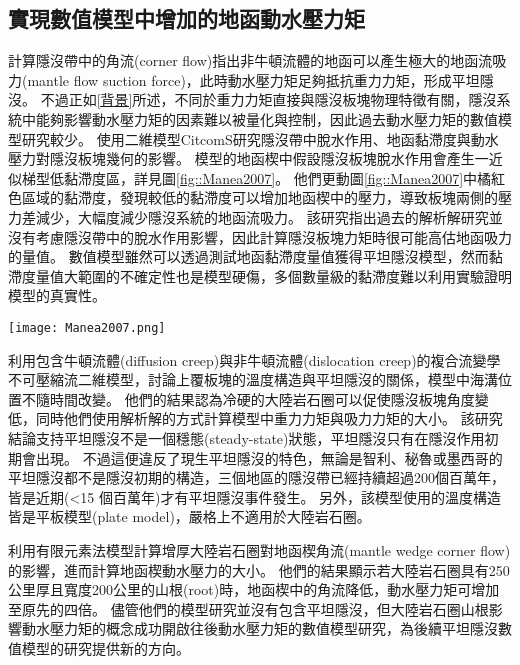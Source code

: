 \subsection{實現數值模型中增加的地函動水壓力矩}
\citealp{tovish1978mantle}計算隱沒帶中的角流(corner flow)指出非牛頓流體的地函可以產生極大的地函流吸力(mantle flow suction force)，此時動水壓力矩足夠抵抗重力力矩，形成平坦隱沒。
不過正如\ref{背景}所述，不同於重力力矩直接與隱沒板塊物理特徵有關，隱沒系統中能夠影響動水壓力矩的因素難以被量化與控制，因此過去動水壓力矩的數值模型研究較少。
\citealp{Manea2007}使用二維模型CitcomS研究隱沒帶中脫水作用、地函黏滯度與動水壓力對隱沒板塊幾何的影響。
模型的地函楔中假設隱沒板塊脫水作用會產生一近似梯型低黏滯度區，詳見圖\ref{fig::Manea2007}。
他們更動圖\ref{fig::Manea2007}中橘紅色區域的黏滯度，發現較低的黏滯度可以增加地函楔中的壓力，導致板塊兩側的壓力差減少，大幅度減少隱沒系統的地函流吸力。
該研究指出過去\citealp{tovish1978mantle}的解析解研究並沒有考慮隱沒帶中的脫水作用影響，因此計算隱沒板塊力矩時很可能高估地函吸力的量值。
數值模型雖然可以透過測試地函黏滯度量值獲得平坦隱沒模型，然而黏滯度量值大範圍的不確定性也是模型硬傷，多個數量級的黏滯度難以利用實驗證明模型的真實性。

\begin{figure*}[ht!]
    \centering
    \texttt{[image: Manea2007.png]}
    \caption[\citealp{Manea2007}模型中所設定的低黏滯度近似梯形區與低黏滯度通道區域]{\citealp{Manea2007}模型中所設定的低黏滯度近似梯形區與低黏滯度通道區域，表示隱沒帶的脫水作用對地函楔造成的影響。}
    \label{fig::Manea2007}
\end{figure*}

\citealp{Thermal2012}利用包含牛頓流體(diffusion creep)與非牛頓流體(dislocation creep)的複合流變學不可壓縮流二維模型，討論上覆板塊的溫度構造與平坦隱沒的關係，模型中海溝位置不隨時間改變。
他們的結果認為冷硬的大陸岩石圈可以促使隱沒板塊角度變低，同時他們使用解析解的方式計算模型中重力力矩與吸力力矩的大小。
該研究結論支持平坦隱沒不是一個穩態(steady-state)狀態，平坦隱沒只有在隱沒作用初期會出現。
不過這便違反了現生平坦隱沒的特色，無論是智利、秘魯或墨西哥的平坦隱沒都不是隱沒初期的構造，三個地區的隱沒帶已經持續超過200個百萬年，皆是近期(<15 個百萬年)才有平坦隱沒事件發生。
另外，該模型使用的溫度構造皆是平板模型(plate model)，嚴格上不適用於大陸岩石圈。

\citealp{o2009subduction}利用有限元素法模型計算增厚大陸岩石圈對地函楔角流(mantle wedge corner flow)的影響，進而計算地函楔動水壓力的大小。
他們的結果顯示若大陸岩石圈具有250公里厚且寬度200公里的山根(root)時，地函楔中的角流降低，動水壓力矩可增加至原先的四倍。
儘管他們的模型研究並沒有包含平坦隱沒，但大陸岩石圈山根影響動水壓力矩的概念成功開啟往後動水壓力矩的數值模型研究，為後續平坦隱沒數值模型的研究提供新的方向。

